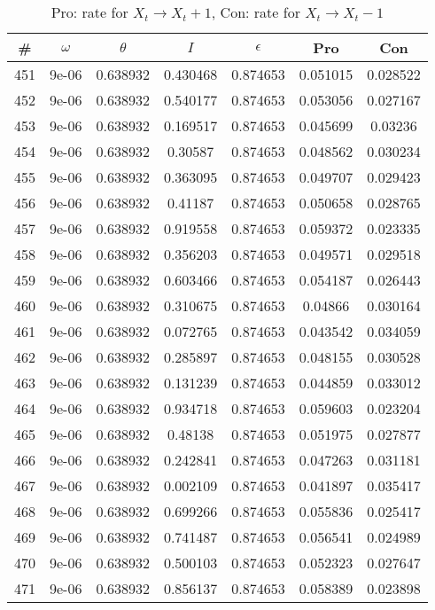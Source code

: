 \newpage
\begin{table}
\caption{Pro: rate for $X_t \rightarrow X_t + 1$, Con: rate for $X_t \rightarrow X_t - 1$}
\begin{tabular*}{\linewidth}{c|c|c|c|c|c|c}
\# & $\omega$ & $\theta$ & $I$ & $\epsilon$ & Pro & Con \\
\hline
451 & 9e-06 & 0.638932 & 0.430468 & 0.874653 & 0.051015 & 0.028522\\
452 & 9e-06 & 0.638932 & 0.540177 & 0.874653 & 0.053056 & 0.027167\\
453 & 9e-06 & 0.638932 & 0.169517 & 0.874653 & 0.045699 & 0.03236\\
454 & 9e-06 & 0.638932 & 0.30587 & 0.874653 & 0.048562 & 0.030234\\
455 & 9e-06 & 0.638932 & 0.363095 & 0.874653 & 0.049707 & 0.029423\\
456 & 9e-06 & 0.638932 & 0.41187 & 0.874653 & 0.050658 & 0.028765\\
457 & 9e-06 & 0.638932 & 0.919558 & 0.874653 & 0.059372 & 0.023335\\
458 & 9e-06 & 0.638932 & 0.356203 & 0.874653 & 0.049571 & 0.029518\\
459 & 9e-06 & 0.638932 & 0.603466 & 0.874653 & 0.054187 & 0.026443\\
460 & 9e-06 & 0.638932 & 0.310675 & 0.874653 & 0.04866 & 0.030164\\
461 & 9e-06 & 0.638932 & 0.072765 & 0.874653 & 0.043542 & 0.034059\\
462 & 9e-06 & 0.638932 & 0.285897 & 0.874653 & 0.048155 & 0.030528\\
463 & 9e-06 & 0.638932 & 0.131239 & 0.874653 & 0.044859 & 0.033012\\
464 & 9e-06 & 0.638932 & 0.934718 & 0.874653 & 0.059603 & 0.023204\\
465 & 9e-06 & 0.638932 & 0.48138 & 0.874653 & 0.051975 & 0.027877\\
466 & 9e-06 & 0.638932 & 0.242841 & 0.874653 & 0.047263 & 0.031181\\
467 & 9e-06 & 0.638932 & 0.002109 & 0.874653 & 0.041897 & 0.035417\\
468 & 9e-06 & 0.638932 & 0.699266 & 0.874653 & 0.055836 & 0.025417\\
469 & 9e-06 & 0.638932 & 0.741487 & 0.874653 & 0.056541 & 0.024989\\
470 & 9e-06 & 0.638932 & 0.500103 & 0.874653 & 0.052323 & 0.027647\\
471 & 9e-06 & 0.638932 & 0.856137 & 0.874653 & 0.058389 & 0.023898\\

\end{tabular*}
\end{table}
